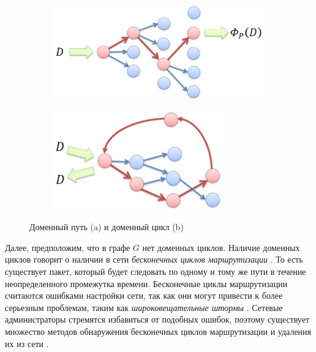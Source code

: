 \documentclass[../thesis.tex]{subfiles}
\begin{document}
\begin{figure}
\centering
\begin{subfigure}[b]{0.4\textwidth}
  \centering
  \includegraphics[width=1.0\textwidth]{figures/domainpath.jpg}
  \caption{} \label{fig:domainpath}
\end{subfigure}
\begin{subfigure}[b]{0.4\textwidth}
  \centering
  \includegraphics[width=0.8\textwidth]{figures/domaincycle.jpg}
  \caption{} \label{fig:domaincycle}
\end{subfigure}
\caption{Доменный путь (a) и доменный цикл (b)}
\end{figure}

Далее, предположим, что в графе $G$ нет доменных циклов.
Наличие доменных циклов говорит о наличии в сети \textit{бесконечных циклов маршрутизации} \cite{tanenbaum1996computer}.
То есть существует пакет, который будет следовать по одному и тому же пути в течение неопределенного промежутка времени.
Бесконечные циклы маршрутизации считаются ошибками настройки сети, так как они могут привести к более серьезным проблемам, таким как \textit{широковещательные штормы} \cite{tseng2002broadcast}.
Сетевые администраторы стремятся избавиться от подобных ошибок, поэтому существует множество методов обнаружения бесконечных циклов маршрутизации и удаления их из сети \cite{kazemian2012header,kazemian2013real,hengartner2002detection}.
\end{document}
